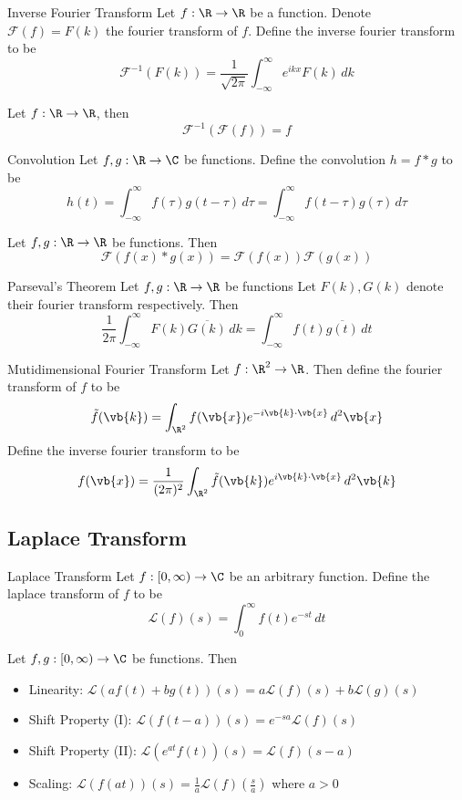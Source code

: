 \documentclass[a4paper]{article}
\begin{document}
\begin{defn}{Inverse Fourier Transform}{} Let $f:\R\to\R$ be a function. Denote $\mathcal{F}(f)=F(k)$ the fourier transform of $f$. Define the inverse fourier transform to be $$\mathcal{F}^{-1}(F(k))=\frac{1}{\sqrt{2\pi}}\int_{-\infty}^\infty e^{ikx}F(k)\,dk$$
\end{defn}

\begin{prp}{}{} Let $f:\R\to\R$, then $$\mathcal{F}^{-1}(\mathcal{F}(f))=f$$
\end{prp}

\begin{defn}{Convolution}{} Let $f,g:\R\to\C$ be functions. Define the convolution $h=f\ast g$ to be $$h(t)=\int_{-\infty}^\infty f(\tau)g(t-\tau)\,d\tau=\int_{-\infty}^\infty f(t-\tau)g(\tau)\,d\tau$$
\end{defn}

\begin{prp}{}{} Let $f,g:\R\to\R$ be functions. Then $$\mathcal{F}(f(x)\ast g(x))=\mathcal{F}(f(x))\mathcal{F}(g(x))$$
\end{prp}

\begin{thm}{Parseval's Theorem}{} Let $f,g:\R\to\R$ be functions Let $F(k),G(k)$ denote their fourier transform respectively. Then $$\frac{1}{2\pi}\int_{-\infty}^\infty F(k)\overline{G(k)}\,dk=\int_{-\infty}^\infty f(t)\overline{g(t)}\,dt$$
\end{thm}

\begin{defn}{Mutidimensional Fourier Transform}{} Let $f:\R^2\to\R$. Then define the fourier transform of $f$ to be $$\tilde{f}(\vb{k})=\int_{\R^2}f(\vb{x})e^{-i\vb{k}\cdot\vb{x}}\,d^2\vb{x}$$ Define the inverse fourier transform to be $$f(\vb{x})=\frac{1}{(2\pi)^2}\int_{\R^2}\tilde{f}(\vb{k})e^{i\vb{k}\cdot\vb{x}}\,d^2\vb{k}$$
\end{defn}


\subsection{Laplace Transform}
\begin{defn}{Laplace Transform}{} Let $f:[0,\infty)\to\C$ be an arbitrary function. Define the laplace transform of $f$ to be $$\mathcal{L}(f)(s)=\int_0^\infty f(t)e^{-st}\,dt$$
\end{defn}

\begin{prp}{}{} Let $f,g:[0,\infty)\to\C$ be functions. Then 
\begin{itemize}
\item Linearity: $\mathcal{L}(af(t)+bg(t))(s)=a\mathcal{L}(f)(s)+b\mathcal{L}(g)(s)$
\item Shift Property (I): $\mathcal{L}(f(t-a))(s)=e^{-sa}\mathcal{L}(f)(s)$
\item Shift Property (II): $\mathcal{L}(e^{at}f(t))(s)=\mathcal{L}(f)(s-a)$
\item Scaling: $\mathcal{L}(f(at))(s)=\frac{1}{a}\mathcal{L}\left(f\right)\left(\frac{s}{a}\right)$ where $a>0$
\end{itemize}
\end{prp}
\end{document}
